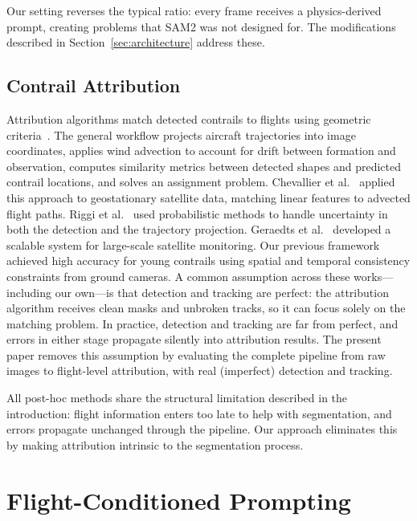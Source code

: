 \documentclass[review]{elsarticle}
\begin{document}
Our setting reverses the typical ratio: every frame receives a physics-derived prompt, creating problems that SAM2 was not designed for. The modifications described in Section~\ref{sec:architecture} address these.

\subsection{Contrail Attribution}

Attribution algorithms match detected contrails to flights using geometric criteria~\cite{chevallier2023linear, riggi2023ai, geraedts2024scalable, dalmau2025attribution}. The general workflow projects aircraft trajectories into image coordinates, applies wind advection to account for drift between formation and observation, computes similarity metrics between detected shapes and predicted contrail locations, and solves an assignment problem. Chevallier et al.~\cite{chevallier2023linear} applied this approach to geostationary satellite data, matching linear features to advected flight paths. Riggi et al.~\cite{riggi2023ai} used probabilistic methods to handle uncertainty in both the detection and the trajectory projection. Geraedts et al.~\cite{geraedts2024scalable} developed a scalable system for large-scale satellite monitoring. Our previous framework~\cite{dalmau2025attribution} achieved high accuracy for young contrails using spatial and temporal consistency constraints from ground cameras. A common assumption across these works---including our own---is that detection and tracking are perfect: the attribution algorithm receives clean masks and unbroken tracks, so it can focus solely on the matching problem. In practice, detection and tracking are far from perfect, and errors in either stage propagate silently into attribution results. The present paper removes this assumption by evaluating the complete pipeline from raw images to flight-level attribution, with real (imperfect) detection and tracking.

All post-hoc methods share the structural limitation described in the introduction: flight information enters too late to help with segmentation, and errors propagate unchanged through the pipeline. Our approach eliminates this by making attribution intrinsic to the segmentation process.

\section{Flight-Conditioned Prompting}
\label{sec:prompting}
\end{document}
